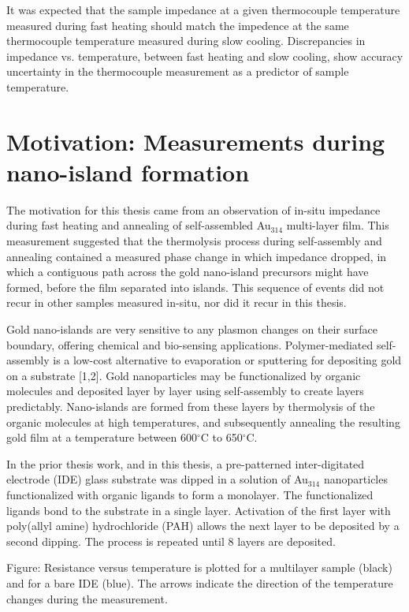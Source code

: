 It was expected that the sample impedance at a given thermocouple temperature measured during fast heating should match the impedence at the same thermocouple temperature measured during slow cooling.
Discrepancies in impedance vs. temperature, between fast heating and slow cooling, show accuracy uncertainty in the thermocouple measurement as a predictor of sample temperature.

\section{Motivation: Measurements during nano-island formation}

The motivation for this thesis came from an observation of in-situ impedance during fast heating and annealing of self-assembled Au$_{314}$ multi-layer film.
This measurement suggested that the thermolysis process during self-assembly and annealing contained a measured phase change in which impedance dropped, 
    in which a contiguous path across the gold nano-island precursors might have formed, before the film separated into islands.
This sequence of events did not recur in other samples measured in-situ, nor did it recur in this thesis.

Gold nano-islands are very sensitive to any plasmon changes on their surface boundary, offering chemical and bio-sensing applications.
Polymer-mediated self-assembly is a low-cost alternative to evaporation or sputtering for depositing gold on a substrate [1,2].  Gold nanoparticles may be functionalized by organic molecules and deposited layer by layer using self-assembly to create layers predictably.
Nano-islands are formed from these layers by thermolysis of the organic molecules at high temperatures, and subsequently annealing the resulting gold film at a temperature between 600$^{\circ}$C to 650$^{\circ}$C.

In the prior thesis work, and in this thesis, a pre-patterned inter-digitated electrode (IDE) glass substrate was dipped in a solution of Au$_{314}$ nanoparticles functionalized with organic ligands to form a monolayer.  
The functionalized ligands bond to the substrate in a single layer.
Activation of the first layer with poly(allyl amine) hydrochloride (PAH) allows the next layer to be deposited by a second dipping.  
The process is repeated until 8 layers are deposited.

Figure: Resistance versus temperature is plotted for a multilayer sample (black) and for a bare IDE (blue).  The arrows indicate the direction of the temperature changes during the measurement.

